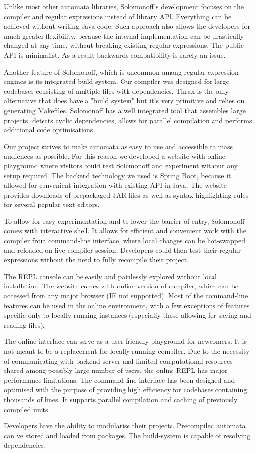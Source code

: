 Unlike most other automata libraries, Solomonoff's development focuses on the compiler and regular expressions instead of library API. Everything can be achieved without writing Java code. Such approach also allows the developers for much greater flexibility, because the internal implementation can be drastically changed at any time, without breaking existing regular expressions. The public API is minimalist. As a result backwards-compatibility is rarely an issue.  

Another feature of Solomonoff, which is uncommon among regular expression engines is its integrated build system. Our compiler was designed for large codebases consisting of multiple files with dependencies. Thrax is the only alternative that does have a "build system" but it's very primitive and relies on generating Makefiles. Solomonoff has a well integrated tool that assembles large projects, detects cyclic dependencies, allows for parallel compilation and performs additional code optimisations. 


Our project strives to make automata as easy to use and accessible to mass audiences as possible. For this reason we developed a website with online playground where visitors could test Solomonoff and experiment without any setup required. The backend technology we used is Spring Boot, because it allowed for convenient integration with existing API in Java. The website provides downloads of prepackaged JAR files as well as syntax highlighting rules for several popular text editors. 



To allow for easy experimentation and to lower the barrier of entry, Solomonoff comes with interactive shell. It allows for efficient and convenient work with the compiler from command-line interface, where local changes can be hot-swapped and reloaded on live compiler session. Developers could then test their regular expressions without the need to fully recompile their project. 

The REPL console can be easily and painlessly explored without local installation. The website comes with online version of compiler, which can be accessed from any major browser (IE not supported). Most of the command-line features can be used in the online environment, with a few exceptions of features specific only to locally-running instances (especially those allowing for saving and reading files). 

The online interface can serve as a user-friendly playground for newcomers. It is not meant to be a replacement for locally running compiler. Due to the necessity of communicating with backend server and limited computational resources shared among possibly large number of users, the online REPL has major performance limitations. The command-line interface has been designed and optimised with the purpose of providing high efficiency for codebases containing thousands of lines. It supports parallel compilation and caching of previously compiled units. 

Developers have the ability to modularise their projects. Precompiled automata can ve stored and loaded from packages. The build-system is capable of resolving dependencies.

